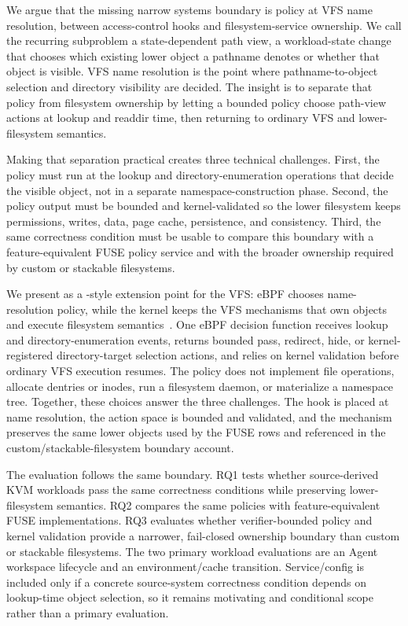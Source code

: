 We argue that the missing narrow systems boundary is policy at VFS name
resolution, between access-control hooks and filesystem-service ownership. We
call the recurring subproblem a state-dependent path view, a workload-state
change that chooses which existing lower object a pathname denotes or whether
that object is visible. VFS name resolution is the point where
pathname-to-object selection and directory visibility are decided. The insight
is to separate that policy from filesystem ownership by letting a bounded
policy choose path-view actions at lookup and readdir time, then returning to
ordinary VFS and lower-filesystem semantics.

Making that separation practical creates three technical challenges. First, the
policy must run at the lookup and directory-enumeration operations that decide
the visible object, not in a separate namespace-construction phase. Second, the
policy output must be bounded and kernel-validated so the lower filesystem keeps
permissions, writes, data, page cache, persistence, and consistency. Third, the
same correctness condition must be usable to compare this boundary with a
feature-equivalent FUSE policy service and with the broader ownership required
by custom or stackable filesystems.

We present \namei as a -style extension point for the VFS:
eBPF chooses name-resolution policy, while the kernel keeps the VFS mechanisms
that own objects and execute filesystem semantics~\cite{linux_sched_ext}. One
eBPF decision function receives lookup and directory-enumeration events,
returns bounded pass, redirect, hide, or kernel-registered directory-target
selection actions, and relies on kernel validation before ordinary VFS
execution resumes.
The policy does not implement file operations, allocate dentries or inodes, run
a filesystem daemon, or materialize a namespace tree. Together, these choices
answer the three challenges. The hook is placed at name resolution, the action
space is bounded and validated, and the mechanism preserves the same lower
objects used by the FUSE rows and referenced in the
custom/stackable-filesystem boundary account.

The evaluation follows the same boundary. RQ1 tests whether source-derived KVM
workloads pass the same correctness conditions while preserving lower-filesystem
semantics. RQ2 compares the same policies with feature-equivalent FUSE
implementations. RQ3 evaluates whether verifier-bounded policy and kernel
validation provide a narrower, fail-closed ownership boundary than custom or
stackable filesystems. The two primary workload evaluations are an Agent
workspace lifecycle and an environment/cache transition. Service/config is
included only if a concrete source-system correctness condition depends on
lookup-time object selection, so it remains motivating and conditional scope
rather than a primary evaluation.

